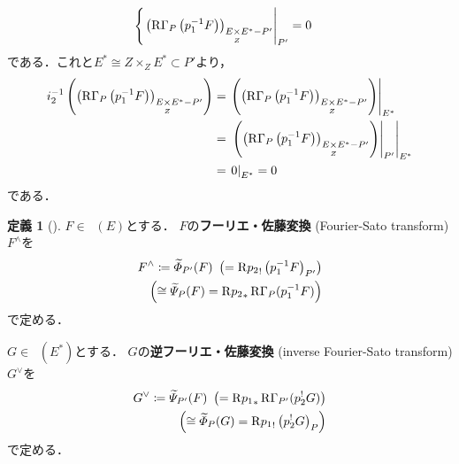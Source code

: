 \documentclass[leqno, 10pt, a4paper, dvipdfmx]{jsarticle}
\makeatletter
\theoremstyle{definition}
\newcommand{\rr}{\mathbf{R}}
\renewenvironment{proof}[1][\proofname]{\par
  \pushQED{\qed}%
  \normalfont \topsep6\p@\@plus6\p@\relax
  \trivlist
  \item[\hskip\labelsep
         \bfseries
    {#1}]\ignorespaces
}{%
  \popQED\endtrivlist\@endpefalse
}
\renewcommand{\proofname}{証明.}
\numberwithin{equation}{section}
\newcommand{\RG}{\mathop{\mathrm{R}\hspace{-0pt}\Gamma}\nolimits}
\newcommand{\Rder}{\mathrm{R}}
\newcommand{\mres}[2][]{{\left.{#1}\right\rvert}_{#2}}
\newcommand{\dpb}[1][]{\mathbin{\mathop{\times}\limits_{#1}}}
\newcommand{\tpb}[1][]{\mathbin{\mathop{\times}\nolimits_{#1}}}
\theoremstyle{mystyle}
\newtheorem{DFN}[AXM]{定義}
\newcommand{\Dlcon}{\mathop{\mathsf{D}^{+}_{\rr_{>0}}}\nolimits}
\makeatother
\begin{document}
\begin{proof}
\begin{description}
\[\begin{cases}
            \mres[\left(\RG_{P}\left(p_1^{-1}F\right)\right)_{E\dpb[Z]E^{\ast}-P'}]{P'}=0
        \end{cases}\]
        である．これと\(E^{\ast}\cong Z\tpb[Z]E^{\ast}\subset P'\)より，
        \begin{align*}
            i_{2}^{-1}\left(
                \left(\RG_{P}\left(p_1^{-1}F\right)\right)_{E\dpb[Z]E^{\ast}-P'}
            \right)
            &=\mres[\left(
                \left(\RG_{P}\left(p_1^{-1}F\right)\right)_{E\dpb[Z]E^{\ast}-P'}
            \right)]{E^{\ast}}\\
            &=\mres[{\mres[\left(
                \left(\RG_{P}\left(p_1^{-1}F\right)\right)_{E\dpb[Z]E^{\ast}-P'}
            \right)]{P'}}]{E^{\ast}}\\
            &=\mres[0]{E^{\ast}}=0
        \end{align*}
        である．
    \end{description}
\end{proof}
\begin{DFN}[{\cite[Definition 3.7.8]{KS90}}]
    \(F\in\Dlcon(E)\)とする．
    \(F\)の\textbf{フーリエ・佐藤変換} (Fourier-Sato transform) 
    \(F^{\wedge}\)を
    \begin{align*}
        F^{\wedge}
        \coloneqq \widetilde{\varPhi}_{P'}(F)\
        \left(=\Rder{p_2}_!\left(p_1^{-1}F\right)_{P'}\right)\\
        \left(
            \cong\widetilde{\varPsi}_{P}(F)
            =\Rder{p_2}_{\ast}\RG_{P}(p_1^{-1}F)
        \right)
    \end{align*}
    で定める．

    \(G\in\Dlcon(E^\ast)\)とする．
    \(G\)の\textbf{逆フーリエ・佐藤変換} (inverse 
    Fourier-Sato transform) \(G^{\vee}\)を
    \begin{align*}
        G^{\vee}
        \coloneqq \widetilde{\varPsi}_{P'}(F)\
        \left(=\Rder{p_1}_{\ast}\RG_{P'}(p_2^{!}G)\right)\\
        \left(
            \cong \widetilde{\varPhi}_{P}(G)
            =\Rder{p_1}_!\left(p_2^{!}G\right)_{P}
        \right)
    \end{align*}
    で定める．
\end{DFN}
\end{document}
